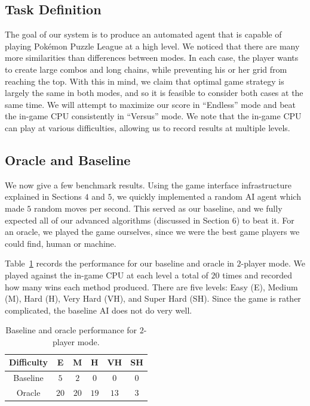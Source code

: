 \documentclass[12pt]{IEEEtran}
\begin{document}
\subsection{Task Definition}

The goal of our system is to produce an automated agent that is capable of playing Pok\'{e}mon Puzzle League at a high level. We noticed that there are many more similarities than differences between modes. In each case, the player wants to create large combos and long chains, while preventing his or her grid from reaching the top. With this in mind, we claim that optimal game strategy is largely the same in both modes, and so it is feasible to consider both cases at the same time. We will attempt to maximize our score in ``Endless'' mode and beat the in-game CPU consistently in ``Versus'' mode. We note that the in-game CPU can play at various difficulties, allowing us to record results at multiple levels.

\subsection{Oracle and Baseline}

We now give a few benchmark results. Using the game interface infrastructure explained in Sections $4$ and $5$, we quickly implemented a random AI agent which made $5$ random moves per second. This served as our baseline, and we fully expected all of our advanced algorithms (discussed in Section $6$) to beat it. For an oracle, we played the game ourselves, since we were the best game players we could find, human or machine.

Table~\ref{tab:baseline} records the performance for our baseline and oracle in $2$-player mode. We played against the in-game CPU at each level a total of $20$ times and recorded how many wins each method produced. There are five levels: Easy (E), Medium (M), Hard (H), Very Hard (VH), and Super Hard (SH). Since the game is rather complicated, the baseline AI does not do very well.

\begin{table}[ht]
\begin{center}
\begin{tabular}{c||c|c|c|c|c}
Difficulty & E & M & H & VH & SH \\ \hline\hline
Baseline & $5$ & $2$ & $0$ & $0$ & $0$ \\ \hline
Oracle & $20$ & $20$ & $19$ & $13$ & $3$
\end{tabular}
\end{center}
\caption{Baseline and oracle performance for $2$-player mode.}
\label{tab:baseline}
\end{table}
\end{document}
